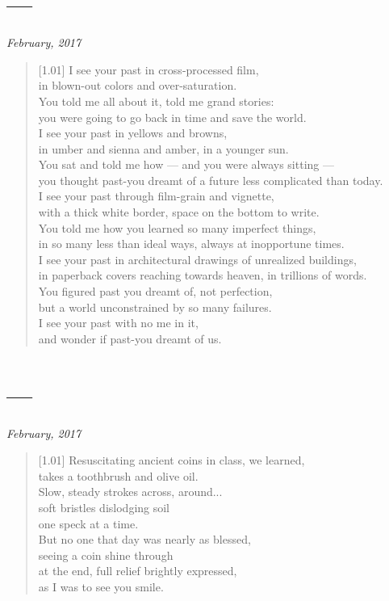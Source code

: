 \section*{---}

\hfill\textit{February, 2017}

\begin{verse}[1.01\textwidth]
  I see your past in cross-processed film,\\
  in blown-out colors and over-saturation.\\
  \vin You told me all about it, told me grand stories:\\
  \vin you were going to go back in time and save the world.\\
  I see your past in yellows and browns,\\
  in umber and sienna and amber, in a younger sun.\\
  \vin You sat and told me how --- and you were always sitting ---\\
  \vin you thought past-you dreamt of a future less complicated than today.\\
  I see your past through film-grain and vignette,\\
  with a thick white border, space on the bottom to write.\\
  \vin You told me how you learned so many imperfect things,\\
  \vin in so many less than ideal ways, always at inopportune times.\\
  I see your past in architectural drawings of unrealized buildings,\\
  in paperback covers reaching towards heaven, in trillions of words.\\
  \vin You figured past you dreamt of, not perfection,\\
  \vin but a world unconstrained by so many failures.\\
  I see your past with no me in it,\\
  and wonder if past-you dreamt of us.
\end{verse}
\newpage

\section*{---}

\hfill\textit{February, 2017}

\begin{verse}[1.01\textwidth]
  Resuscitating ancient coins in class, we learned,\\
  takes a toothbrush and olive oil.\\
  Slow, steady strokes across, around...\\
  soft bristles dislodging soil\\
  one speck at a time.\\
  But no one that day was nearly as blessed,\\
  seeing a coin shine through\\
  at the end, full relief brightly expressed,\\
  as I was to see you smile.
\end{verse}
\newpage

